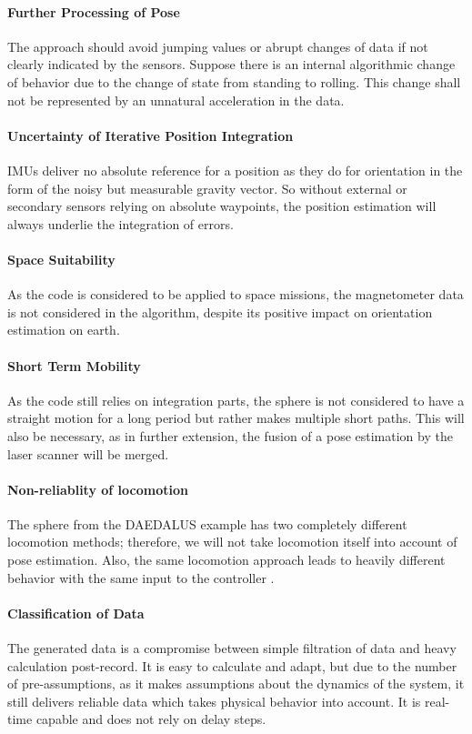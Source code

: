 \documentclass[letterpaper, 10 pt, conference]{ieeeconf}  %
\begin{document}
\paragraph*{Further Processing of Pose}
The approach should avoid jumping values or abrupt changes of data if not clearly indicated by the sensors. Suppose there is an internal algorithmic change of behavior due to the change of state from standing to rolling. This change shall not be represented by an unnatural acceleration in the data.
\paragraph*{Uncertainty of Iterative Position Integration}
IMUs deliver no absolute reference for a position as they do for orientation in the form of the noisy but measurable gravity vector. So without external or secondary sensors relying on absolute waypoints, the position estimation will always underlie the integration of errors.
\paragraph*{Space Suitability}
As the code is considered to be applied to space missions, the magnetometer data is not considered in the algorithm, despite its positive impact on orientation estimation on earth.
\paragraph*{Short Term Mobility}
As the code still relies on integration parts, the sphere is not considered to have a straight motion for a long period but rather makes multiple short paths. This will also be necessary, as in further extension, the fusion of a pose estimation by the laser scanner will be merged. 
\paragraph*{Non-reliablity of locomotion}
The sphere from the DAEDALUS example has two completely different locomotion methods; therefore, we will not take locomotion itself into account of pose estimation. Also, the same locomotion approach leads to heavily different behavior with the same input to the controller \cite{rossi2021daedalus}.
\paragraph*{Classification of Data}
The generated data is a compromise between simple filtration of data and heavy calculation post-record. It is easy to calculate and adapt, but due to the number of pre-assumptions, as it makes assumptions about the dynamics of the system, it still delivers reliable data which takes physical behavior into account. It is real-time capable and does not rely on delay steps.
\end{document}
